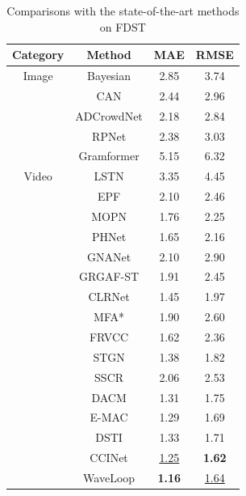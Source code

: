 \documentclass[lettersize,journal]{IEEEtran}
\begin{document}
\begin{table}[h]
\caption{Comparisons with the state-of-the-art methods on FDST}
\centering
\scriptsize
\begin{tabular}{@{}cccc@{}}
\toprule
Category & Method & MAE & RMSE  \\ 
\midrule
Image & Bayesian \cite{ma2019bayesian} & 2.85 & 3.74 \\
& CAN \cite{liu2019context} & 2.44 & 2.96 \\
& ADCrowdNet \cite{liu2019adcrowdnet} & 2.18 & 2.84 \\
& RPNet \cite{yang2020reverse} & 2.38 & 3.03 \\
& Gramformer \cite{lin2024gramformer} & 5.15 & 6.32 \\
\midrule
Video & LSTN \cite{fang2019locality} & 3.35 & 4.45 \\
& EPF \cite{liu2020estimating} & 2.10 & 2.46 \\
& MOPN \cite{hossain2020video}  & 1.76 & 2.25 \\
& PHNet \cite{meng2021phnet} & 1.65 & 2.16 \\
& GNANet \cite{li2022video} & 2.10 & 2.90 \\
& GRGAF-ST \cite{cai2022global} & 1.91 & 2.45 \\
& CLRNet \cite{dong2022clrnet} & 1.45 & 1.97 \\
& MFA* \cite{ling2023motional} & 1.90 & 2.60 \\
& FRVCC \cite{hou2023frame} & 1.62 & 2.36 \\
& STGN \cite{wu2022spatial} & {1.38} & {1.82} \\
& SSCR \cite{yong2025lightweight} & 2.06 & 2.53 \\
& DACM \cite{ling2025dual} & 1.31 & 1.75 \\
& E-MAC \cite{cao2024efficient} & 1.29 & 1.69 \\
& DSTI \cite{ling2026dual} & 1.33 & 1.71 \\
& CCINet \cite{ling2026cascaded} & \underline{1.25} & \textbf{1.62} \\
& WaveLoop  & \textbf{1.16} & \underline{1.64} \\
\bottomrule
\end{tabular}
\label{tab:2}
 \vspace{-1em}
\end{table}
\end{document}
